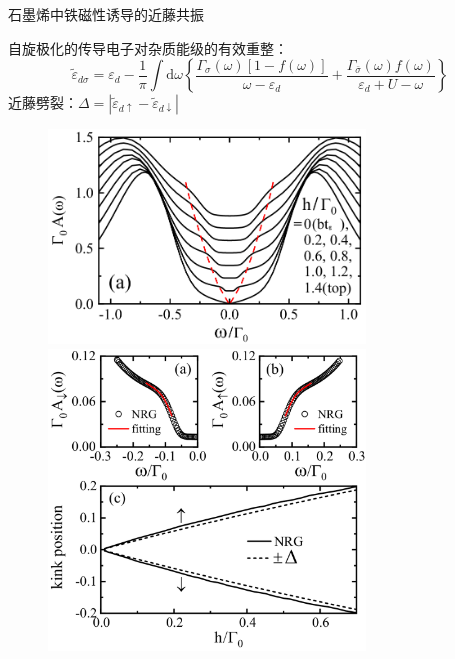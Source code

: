 \documentclass[9pt,t]{beamer} %
\begin{document}
\begin{frame}{石墨烯中铁磁性诱导的近藤共振}
\begin{minipage}[t]{0.55 \textwidth}
\begin{equation}
\end{equation}
自旋极化的传导电子对杂质能级的有效重整：
\begin{equation}\nonumber
\widetilde{\varepsilon}_{d \sigma}=\varepsilon_{d}-\frac{1}{\pi} \int \mathrm{d} \omega\left\{\frac{\Gamma_{\sigma}(\omega)[1-f(\omega)]}{\omega-\varepsilon_{d}}+\frac{\Gamma_{\bar{\sigma}}(\omega) f(\omega)}{\varepsilon_{d}+U-\omega}\right\}
\end{equation}
近藤劈裂：\qquad \qquad$\Delta=\left|\widetilde{\varepsilon}_{d \uparrow}-\widetilde{\varepsilon}_{d \downarrow}\right|$
\end{minipage}%
\begin{minipage}[t]{0.5 \textwidth}
\vspace{-0.4cm}
\begin{figure}
\includegraphics[width=0.75\textwidth]{fig3.png}
\includegraphics[width=0.75\textwidth]{fig4.png}
\end{figure}
\vspace{-0.4cm}
\end{minipage}
\end{frame}
\end{document}
